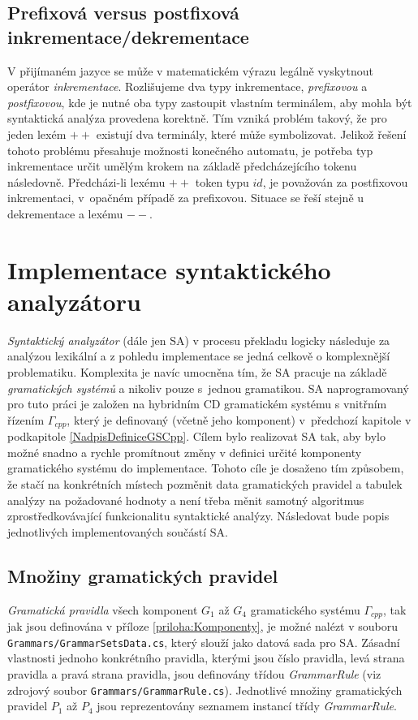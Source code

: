 \subsection*{Prefixová versus postfixová inkrementace/dekrementace}
V přijímaném jazyce se může v matematickém výrazu legálně vyskytnout operátor \emph{inkrementace}. Rozlišujeme dva typy inkrementace,
\emph{prefixovou} a \emph{postfixovou}, kde je nutné oba typy zastoupit vlastním terminálem, aby mohla být syntaktická analýza provedena korektně. Tím vzniká problém takový, že
pro jeden lexém $++$ existují dva terminály, které může symbolizovat. Jelikož řešení tohoto problému přesahuje možnosti konečného automatu, je potřeba typ inkrementace
určit umělým krokem na základě předcházejícího
tokenu následovně. Předcházi-li lexému $++$ token typu $id$, je považován za postfixovou inkrementaci, v~opačném případě za prefixovou. Situace se řeší stejně u dekrementace
a lexému $--$.


\section{Implementace syntaktického analyzátoru}

\emph{Syntaktický analyzátor} (dále jen SA) v procesu překladu logicky následuje za analýzou lexikální a z pohledu implementace se jedná celkově o komplexnější problematiku.
Komplexita je navíc umocněna tím, že SA pracuje na základě \emph{gramatických systémů} a nikoliv pouze s~jednou gramatikou. SA naprogramovaný pro tuto práci je založen na
hybridním CD gramatickém systému s vnitřním řízením $\Gamma_{cpp}$, který je definovaný (včetně jeho komponent) v~předchozí kapitole v podkapitole \ref{NadpisDefiniceGSCpp}.
Cílem bylo realizovat SA tak, aby bylo možné snadno a rychle promítnout změny v definici určité komponenty gramatického systému do implementace. Tohoto cíle je dosaženo
tím způsobem, že stačí na konkrétních místech pozměnit data gramatických pravidel a tabulek analýzy na požadované hodnoty a není třeba měnit samotný algoritmus
zprostředkovávající funkcionalitu syntaktické analýzy. Následovat bude popis jednotlivých implementovaných součástí SA.

\subsection*{Množiny gramatických pravidel}
\emph{Gramatická pravidla} všech komponent $G_1$ až $G_4$ gramatického systému $\Gamma_{cpp}$, tak jak jsou definována v příloze \ref{priloha:Komponenty}, je možné
nalézt v souboru \verb|Grammars/GrammarSetsData.cs|, který slouží jako datová sada pro SA.
Zásadní vlastnosti jednoho konkrétního pravidla, kterými jsou číslo pravidla, levá strana pravidla a pravá strana pravidla,
jsou definovány třídou \emph{GrammarRule} (viz zdrojový soubor \verb|Grammars/GrammarRule.cs|). Jednotlivé množiny gramatických pravidel $P_1$ až $P_4$ jsou reprezentovány
seznamem instancí třídy \emph{GrammarRule}.

